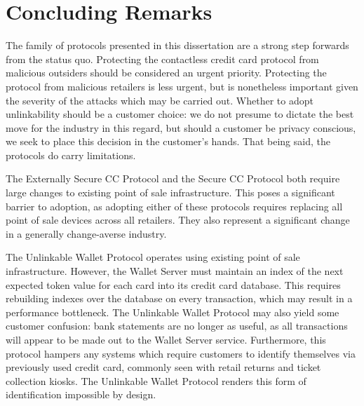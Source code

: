 \section{Concluding Remarks}

The family of protocols presented in this dissertation are a strong step forwards from the status quo.
Protecting the contactless credit card protocol from malicious outsiders should be considered an urgent priority.
Protecting the protocol from malicious retailers is less urgent, but is nonetheless important given the severity of the attacks which may be carried out.
Whether to adopt unlinkability should be a customer choice:
    we do not presume to dictate the best move for the industry in this regard, but should a customer be privacy conscious, we seek to place this decision in the customer's hands.
That being said, the protocols do carry limitations.

The Externally Secure CC Protocol and the Secure CC Protocol both require large changes to existing point of sale infrastructure.
This poses a significant barrier to adoption, as adopting either of these protocols requires replacing all point of sale devices across all retailers.
They also represent a significant change in a generally change-averse industry.

The Unlinkable Wallet Protocol operates using existing point of sale infrastructure.
However, the Wallet Server must maintain an index of the next expected token value for each card into its credit card database.
This requires rebuilding indexes over the database on every transaction, which may result in a performance bottleneck.
The Unlinkable Wallet Protocol may also yield some customer confusion:
    bank statements are no longer as useful, as all transactions will appear to be made out to the Wallet Server service.
Furthermore, this protocol hampers any systems which require customers to identify themselves via previously used credit card,
    commonly seen with retail returns and ticket collection kiosks.
The Unlinkable Wallet Protocol renders this form of identification impossible by design.
